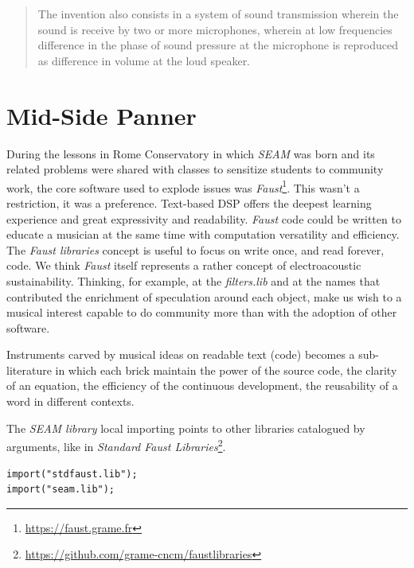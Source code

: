 \documentclass{article}
\begin{document}
\begin{quotation}
The invention also consists in a system of sound transmission wherein the sound
is receive by two or more microphones, wherein at low frequencies difference in
the phase of sound pressure at the microphone is reproduced as difference in
volume at the loud speaker.
\end{quotation}

\vfill\null

\newpage

\section{Mid-Side Panner}
\label{sec:mspanner}

During the lessons in Rome Conservatory in which \emph{SEAM} was born and its
related problems were shared with classes to sensitize students to community
work, the core software used to explode issues was \emph{Faust}\footnote{
\url{https://faust.grame.fr}}. This wasn't a restriction, it was a preference.
Text-based DSP offers the deepest learning experience and great expressivity
and readability. \emph{Faust} code could be written to educate a musician at
the same time with computation versatility and efficiency. The \emph{Faust
libraries} concept is useful to focus on write once, and read forever, code.
We think \emph{Faust} itself represents a rather concept of electroacoustic
sustainability. Thinking, for example, at the \emph{filters.lib} and at the
names that contributed the enrichment of speculation around each object, make
us wish to a musical interest capable to do community more than with the
adoption of other software.

Instruments carved by musical ideas on readable text (code) becomes a
sub-literature in which each brick maintain the power of the source code, the
clarity of an equation, the efficiency of the continuous development, the
reusability of a word in different contexts.

The \emph{SEAM library} local importing points to other libraries catalogued
by arguments, like in \emph{Standard Faust Libraries}\footnote{
\url{https://github.com/grame-cncm/faustlibraries}}.

\begin{lstlisting}
import("stdfaust.lib");
import("seam.lib");
\end{lstlisting}
\end{document}
